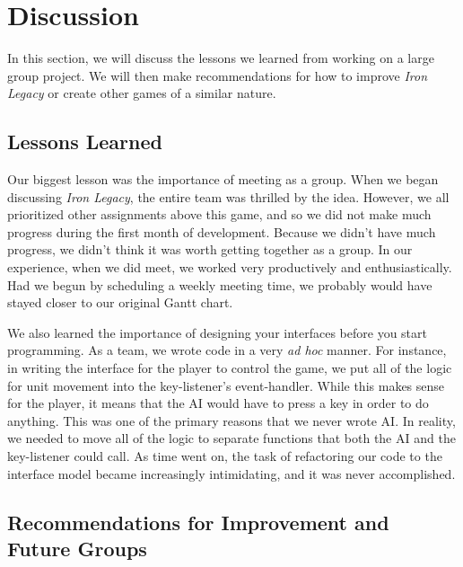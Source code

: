 \documentclass{article}
\begin{document}
\section*{Discussion}

In this section, we will discuss the lessons we learned from working 
    on a large group project.
    We will then make recommendations for how to improve \emph{Iron Legacy}
    or create other games of a similar nature.

\subsection*{Lessons Learned}

Our biggest lesson was the importance of meeting as a group.
    When we began discussing \emph{Iron Legacy}, the entire team was thrilled
    by the idea.
    However, we all prioritized other assignments above this game,
    and so we did not make much progress during the first month of development.
    Because we didn't have much progress, we didn't think it was worth
    getting together as a group.
    In our experience, when we did meet, we worked very productively
    and enthusiastically.
    Had we begun by scheduling a weekly meeting time,
    we probably would have stayed closer to our original Gantt chart.

We also learned the importance of designing your interfaces before you start
    programming.
    As a team, we wrote code in a very \emph{ad hoc} manner.
    For instance, in writing the interface for the player to control the game,
    we put all of the logic for unit movement into the key-listener's
    event-handler.
    While this makes sense for the player, it means that the AI would have
    to press a key in order to do anything.
    This was one of the primary reasons that we never wrote AI.
    In reality, we needed to move all of the logic to separate functions that
    both the AI and the key-listener could call.
    As time went on, the task of refactoring our code to the interface model
    became increasingly intimidating, and it was never accomplished.

\subsection*{Recommendations for Improvement and Future Groups}
\end{document}
